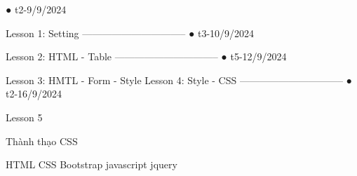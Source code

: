 ● t2-9/9/2024

Lesson 1: Setting
--------------------------------   
    ● t3-10/9/2024

Lesson 2: HTML - Table
--------------------------------
    ● t5-12/9/2024

Lesson 3: HMTL - Form - Style
Lesson 4: Style - CSS
--------------------------------
    ● t2-16/9/2024

Lesson 5



Thành thạo CSS

HTML
CSS
Bootstrap 
javascript
jquery